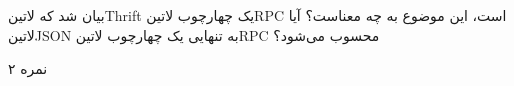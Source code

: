 \documentclass[../main.tex]{subfiles}
\begin{document}

بیان شد که ‌لاتین{Thrift} یک چهارچوب ‌لاتین{RPC} است، این موضوع به چه معناست؟ آیا ‌لاتین{JSON} به تنهایی یک چهارچوب ‌لاتین{RPC} محسوب می‌شود؟

۲ نمره
\end{document}
